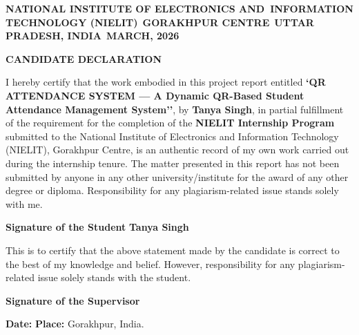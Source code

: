 \newpage
\thispagestyle{empty}

\begin{center}
    \textbf{NATIONAL INSTITUTE OF ELECTRONICS AND\
    INFORMATION TECHNOLOGY (NIELIT)}\
    \textbf{GORAKHPUR CENTRE}\
    \textbf{UTTAR PRADESH, INDIA}\
    \textbf{MARCH, 2026}\
\end{center}
\vspace{1cm}
\begin{center}
    \textbf{\large CANDIDATE DECLARATION}
\end{center}

\vspace{0.5cm}

I hereby certify that the work embodied in this project report entitled
\textbf{`QR ATTENDANCE SYSTEM --- A Dynamic QR-Based Student Attendance Management System''},
by \textbf{Tanya Singh}, in partial fulfillment of the requirement for the completion of the
\textbf{NIELIT Internship Program} submitted to the
National Institute of Electronics and Information Technology (NIELIT), Gorakhpur Centre,
is an authentic record of my own work carried out during the internship tenure.
The matter presented in this report has not been submitted by anyone in any other university/institute for the award of any other degree or diploma.
Responsibility for any plagiarism-related issue stands solely with me.

\vspace{1.5cm}

\noindent
\textbf{Signature of the Student} \hfill \textbf{Tanya Singh}

\vspace{1.5cm}

This is to certify that the above statement made by the candidate is correct to the best of my knowledge and belief.
However, responsibility for any plagiarism-related issue solely stands with the student.

\vspace{1.5cm}

\noindent
\textbf{Signature of the Supervisor}

\vspace{1.5cm}

\noindent
\textbf{Date:} \underline{\hspace{3cm}} \hfill \textbf{Place:} Gorakhpur, India.
